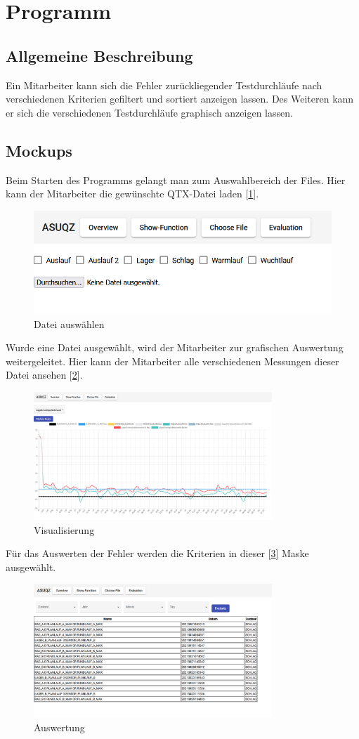 \section{Programm}
\subsection{Allgemeine Beschreibung}
Ein Mitarbeiter kann sich die Fehler zurückliegender Testdurchläufe nach verschiedenen Kriterien gefiltert und sortiert
anzeigen lassen. Des Weiteren kann er sich die verschiedenen Testdurchläufe graphisch anzeigen lassen.

\subsection{Mockups}
Beim Starten des Programms gelangt man zum Auswahlbereich der Files. 
Hier kann der Mitarbeiter die gewünschte QTX-Datei laden [\ref{fig:choosefile}].
\begin{figure}[h]
    \centering
    \includegraphics{pics/choosefile.png}
    \caption{Datei auswählen}
    \label{fig:choosefile}
\end{figure}

Wurde eine Datei ausgewählt, wird der Mitarbeiter zur grafischen Auswertung weitergeleitet. Hier kann der Mitarbeiter alle 
verschiedenen Messungen dieser Datei ansehen [\ref{fig:visualization}].
\begin{figure}[h]
    \centering
    \includegraphics[width=0.80\textwidth]{pics/graph.PNG}
    \caption{Visualisierung}
    \label{fig:visualization}
\end{figure}

Für das Auswerten der Fehler werden die Kriterien in dieser [\ref{fig:evaluation}] Maske ausgewählt.
\begin{figure}[h]
    \centering
    \includegraphics[width=0.80\textwidth]{pics/evaluation.png}
    \caption{Auswertung}
    \label{fig:evaluation}
\end{figure}
